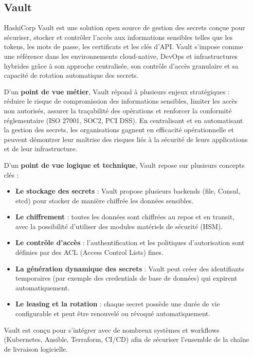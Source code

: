 \subsection{Vault}

HashiCorp Vault est une solution open source de gestion des secrets conçue pour sécuriser, stocker et contrôler l’accès aux informations sensibles telles que les tokens, les mots de passe, les certificats et les clés d’API. Vault s’impose comme une référence dans les environnements cloud-native, DevOps et infrastructures hybrides grâce à son approche centralisée, son contrôle d’accès granulaire et sa capacité de rotation automatique des secrets.

D’un \textbf{point de vue métier}, Vault répond à plusieurs enjeux stratégiques  : réduire le risque de compromission des informations sensibles, limiter les accès non autorisés, assurer la traçabilité des opérations et renforcer la conformité réglementaire (ISO 27001, SOC2, PCI DSS). En centralisant et en automatisant la gestion des secrets, les organisations gagnent en efficacité opérationnelle et peuvent démontrer leur maîtrise des risques liés à la sécurité de leurs applications et de leur infrastructure.

D’un \textbf{point de vue logique et technique}, Vault repose sur plusieurs concepts clés  :
\begin{itemize}
	\item \textbf{Le stockage des secrets}  : Vault propose plusieurs backends (file, Consul, etcd) pour stocker de manière chiffrée les données sensibles.
	\item \textbf{Le chiffrement}  : toutes les données sont chiffrées au repos et en transit, avec la possibilité d’utiliser des modules matériels de sécurité (HSM).
	\item \textbf{Le contrôle d’accès}  : l’authentification et les politiques d’autorisation sont définies par des ACL (Access Control Lists) fines.
	\item \textbf{La génération dynamique des secrets}  : Vault peut créer des identifiants temporaires (par exemple des credentials de base de données) qui expirent automatiquement.
	\item \textbf{Le leasing et la rotation}  : chaque secret possède une durée de vie configurable et peut être renouvelé ou révoqué automatiquement.
\end{itemize}

Vault est conçu pour s’intégrer avec de nombreux systèmes et workflows (Kubernetes, Ansible, Terraform, CI/CD) afin de sécuriser l’ensemble de la chaîne de livraison logicielle.

